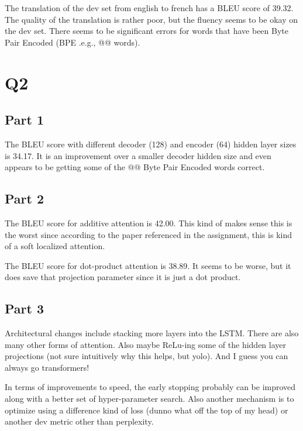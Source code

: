 \documentclass[11pt]{article}
\begin{document}
\bigskip

\noindent The translation of the dev set from english to french has a BLEU score of 39.32.
The quality of the translation is rather poor, but the fluency seems to be okay on the dev set.
There seems to be significant errors for words that have been Byte Pair Encoded (BPE .e.g., @@ words).

\section*{Q2}

\subsection*{Part 1}

The BLEU score with different decoder (128) and encoder (64) hidden layer sizes is 34.17. It is an improvement over a smaller decoder hidden size
and even appears to be getting some of the @@ Byte Pair Encoded words correct.

\subsection*{Part 2}

The BLEU score for additive attention is 42.00. This kind of makes sense this is the worst since according to the paper referenced in the assignment,
this is kind of a soft localized attention. 

\bigskip

\noindent The BLEU score for dot-product attention is 38.89. It seems to be worse, but it does save that projection parameter since it is just a
dot product.

\subsection*{Part 3}

Architectural changes include stacking more layers into the LSTM. There are also many other forms of attention. Also maybe ReLu-ing some
of the hidden layer projections (not sure intuitively why this helps, but yolo). And I guess you can always go transformers!

\bigskip

\noindent In terms of improvements to speed, the early stopping probably can be improved along with a better set of hyper-parameter search. Also
another mechanism is to optimize using a difference kind of loss (dunno what off the top of my head) or another dev metric other than perplexity.
\end{document}
